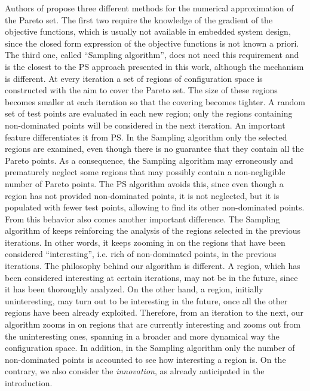 Authors of \cite{dellnitz2005covering,dellnitz2009computation} propose
three different methods for the numerical approximation of the Pareto
set. The first two require the knowledge of the gradient of the
objective functions, which is usually not available in embedded system
design, since the closed form expression of the objective functions is
not known a priori. The third one, called ``Sampling algorithm'', does
not need this requirement and is the closest to the PS approach
presented in this work, although the
mechanism is different. At every iteration a set of regions of
configuration space is constructed with the aim to cover the Pareto
set. The size of these regions becomes smaller at each iteration so
that the covering becomes tighter. A random set of test points are
evaluated in each new region; only the regions containing
non-dominated points will be considered in the next iteration.
An important feature differentiates it from PS. In the Sampling algorithm only the
selected regions are examined, even though there is no guarantee that
they contain all the Pareto points. As a consequence, the
Sampling algorithm may erroneously and prematurely neglect some
regions that may possibly contain a non-negligible number of Pareto
points. The PS algorithm avoids this, since even though a region has not
provided non-dominated points, it is not neglected, but it is
populated with fewer test points, allowing to
find its other non-dominated points. From this behavior also comes
another important difference. The Sampling algorithm of
\cite{dellnitz2005covering} keeps reinforcing the analysis of the
regions selected in the previous iterations. In other words, it keeps
zooming in on the regions that have been considered ``interesting'',
i.e. rich of non-dominated points, in the previous iterations. The
philosophy behind our algorithm is different. A region, which has been
considered interesting at certain iterations, may not be in the
future, since it has been thoroughly analyzed. On the other hand, a
region, initially uninteresting, may turn out to be interesting in the
future, once all the other regions have been already exploited.
Therefore, from an iteration to the next, our algorithm zooms in on
regions that are currently interesting and zooms out from the
uninteresting ones,  spanning in a broader and more dynamical way the
configuration space. In addition, in the Sampling algorithm only the
number of non-dominated points is accounted to see how interesting a
region is. On the contrary, we also consider the \emph{innovation}, as
already anticipated in the introduction.

